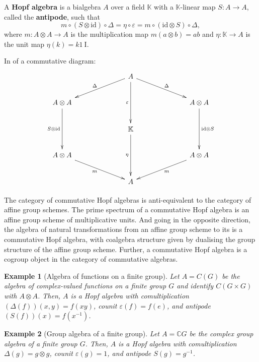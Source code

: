 \documentclass[12pt]{article}
\newcommand*{\Cset}{\mathbb{C}}
\newcommand*{\Kset}{\mathbb{K}}
\newcommand*{\identity}{\mathord{\mathrm{1\!\!\!\:I}}}
\newcommand*{\id}{\mathrm{id}}
\theoremstyle{inlinedefn}
\theoremstyle{break}
\newtheorem{example}{Example}
\begin{document}
A \textbf{Hopf algebra} is a bialgebra $A$ over a field $\Kset$ with a $\Kset$-linear map $S : A \to A$,
called the \textbf{antipode}, such that
\begin{equation}
m\circ(S\otimes\id)\circ\Delta = \eta\circ\varepsilon = m\circ(\id\otimes S)\circ\Delta,
\end{equation}
where $m : A\otimes A \to A$ is the multiplication map $m(a\otimes b) = ab$ and $\eta : \Kset \to A$ is the unit map $\eta(k) = k\identity$.

In  of a commutative diagram:
\[\begin{xy}
\xymatrix@R=20pt@C=70pt{
& *+<10pt>\txt{$A$} \ar_{\Delta}[dl] \ar_{\varepsilon}[dd] \ar^{\Delta}[dr] & \\
*+<10pt>\txt{$A\otimes A$} \ar_{S\otimes\id}[dd] & & *+<10pt>\txt{$A\otimes A$} \ar^{\id\otimes S}[dd] \\
& *+<10pt>\txt{$\Kset$} \ar_{\eta}[dd] & \\
*+<10pt>\txt{$A\otimes A$} \ar_{m}[dr] & & *+<10pt>\txt{$A\otimes A$} \ar^{m}[dl] \\
& *+<10pt>\txt{$A$} &
}\end{xy}\]

The category of commutative Hopf algebras is anti-equivalent to the category of affine group schemes.
The prime spectrum of a commutative Hopf algebra is an affine group scheme of multiplicative units.
And going in the opposite direction, the algebra of natural transformations from an affine group scheme
to its  is a commutative Hopf algebra,
with coalgebra structure given by dualising the group structure of the affine group scheme.
Further, a commutative Hopf algebra is a cogroup object in the category of commutative algebras.


\begin{example}[Algebra of functions on a finite group]
Let $A = C(G)$ be the algebra of complex-valued functions on a finite group $G$
and identify $C(G\times G)$ with $A \otimes A$.
Then, $A$ is a Hopf algebra with comultiplication $(\Delta(f))(x,y) = f(xy)$,
counit $\varepsilon(f) = f(e)$,
and antipode $(S(f))(x) = f(x^{-1})$.
\end{example}

\begin{example}[Group algebra of a finite group]
Let $A = \Cset G$ be the complex group algebra of a finite group $G$.
Then, $A$ is a Hopf algebra with comultiplication $\Delta(g) = g \otimes g$,
counit $\varepsilon(g) = 1$,
and antipode $S(g) = g^{-1}$.
\end{example}
\end{document}
